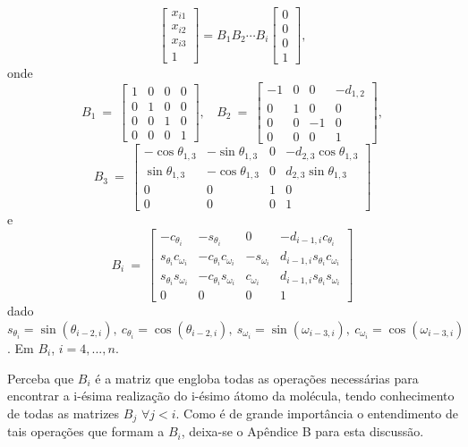 \documentclass[a4paper,12pt]{article}
\begin{document}
	$$
	\begin{bmatrix}
	x_{i1}\\ 
	x_{i2}\\ 
	x_{i3}\\ 
	1
	\end{bmatrix}
	= B_{1}B_{2}\cdots B_{i}\begin{bmatrix}
	0\\ 
	0\\ 
	0\\ 
	1
	\end{bmatrix},
	$$
	onde
	$$
	B_1\: =\:
	\begin{bmatrix}
	1 & 0 & 0 & 0\\ 
	0 & 1 & 0 & 0\\ 
	0 & 0 & 1 & 0\\ 
	0 & 0 & 0 & 1
	\end{bmatrix},\:\:\:
	\: B_2\: =\:
	\begin{bmatrix}
	-1 & 0 & 0 & -d_{1,2}\\
	0 & 1 & 0 & 0\\ 
	0 & 0 & -1 & 0\\ 
	0 & 0 & 0 & 1
	\end{bmatrix},
	$$
	$$
	B_3\:=\:
	\begin{bmatrix}
	-\cos\theta_{1,3} & -\sin\theta_{1,3} & 0 & -d_{2,3}\cos\theta_{1,3}\\ 
	\sin\theta_{1,3} & -\cos\theta_{1,3} & 0 & d_{2,3}\sin\theta_{1,3}\\ 
	0 & 0 & 1 & 0\\ 
	0 & 0 & 0 & 1
	\end{bmatrix}
	$$
	e
	$$
	B_i\:=\:
	\begin{bmatrix}
	-c_{\theta_{i}} & -s_{\theta_{i}} & 0 & -d_{i-1,i}c_{\theta_{i}}\\ 
	s_{\theta_{i}}c_{\omega_{i}} & -c_{\theta_{i}}c_{\omega_{i}}
	& -s_{\omega_{i}} & d_{i-1,i}s_{\theta_{i}}c_{\omega_{i}}\\ 
	s_{\theta_{i}}s_{\omega_{i}} & -c_{\theta_{i}}s_{\omega_{i}} & c_{\omega_{i}} & d_{i-1,i}s_{\theta_{i}}s_{\omega_{i}}\\ 
	0 & 0 & 0 & 1
	\end{bmatrix}
	$$
	dado $s_{\theta_{i}}=\sin (\theta_{i-2, i}),\: c_{\theta_{i}}=\cos (\theta_{i-2, i}),\: s_{\omega_{i}}=\sin (\omega_{i-3, i}),\: c_{\omega_{i}}=\cos (\omega_{i-3, i})$. Em $B_i$, $i=4, ..., n$.
	
	
	Perceba que $B_i$ é a matriz que engloba todas as operações necessárias para encontrar a i-ésima realização do i-ésimo átomo da molécula, tendo conhecimento de todas as matrizes $B_j$ $\forall j < i$. Como é de grande importância o entendimento de tais operações que formam a $B_i$, deixa-se o Apêndice B para esta discussão.
	
\end{document}
